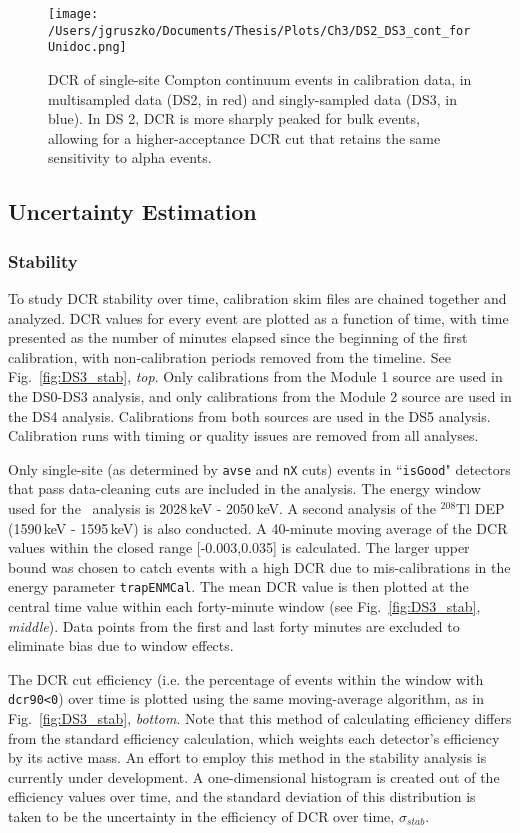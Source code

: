 \begin{figure}[h]
 \centering
 \texttt{[image: /Users/jgruszko/Documents/Thesis/Plots/Ch3/DS2\_DS3\_cont\_forUnidoc.png]}
 \caption[Comparison of DCR in singly-sampled and multi-sampled MJD data sets]{DCR of single-site Compton continuum events in calibration data, in multisampled data (DS2, in red) and singly-sampled data (DS3, in blue). In DS 2, DCR is more sharply peaked for bulk events, allowing for a higher-acceptance DCR cut that retains the same sensitivity to alpha events.} 
 \label{fig:DS2_DS3_comparison}
\end{figure}


\subsection{Uncertainty Estimation}
\subsubsection{Stability}
To study DCR stability over time, calibration skim files are chained together and analyzed.  DCR values for every event are plotted as a function of time, with time presented as the number of minutes elapsed since the beginning of the first calibration, with non-calibration periods removed from the timeline. See Fig.~\ref{fig:DS3_stab}, {\it top}. Only calibrations from the Module 1 source are used in the DS0-DS3 analysis, and only calibrations from the Module 2 source are used in the DS4 analysis.  Calibrations from both sources are used in the DS5 analysis. Calibration runs with timing or quality issues are removed from all analyses.  

Only single-site (as determined by {\tt avse} and {\tt nX} cuts) events in ``{\tt isGood}" detectors that pass data-cleaning cuts are included in the analysis. The energy window used for the \nonubb\ analysis is 2028\,keV - 2050\,keV. A second analysis of the $^{208}$Tl DEP (1590\,keV - 1595\,keV) is also conducted. A 40-minute moving average of the DCR values within the closed range [-0.003,0.035] is calculated. The larger upper bound was chosen to catch events with a high DCR due to mis-calibrations in the energy parameter {\tt trapENMCal}. The mean DCR value is then plotted at the central time value within each forty-minute window (see Fig.~\ref{fig:DS3_stab}, {\it middle}). Data points from the first and last forty minutes are excluded to eliminate bias due to window effects. 

The DCR cut efficiency (i.e.  the percentage of events within the window with {\tt dcr90<0}) over time is plotted using the same moving-average algorithm, as in Fig.~\ref{fig:DS3_stab}, {\it bottom}. Note that this method of calculating efficiency differs from the standard efficiency calculation, which weights each detector's efficiency by its active mass.  An effort to employ this method in the stability analysis is currently under development. A one-dimensional histogram is created out of the efficiency values over time, and the standard deviation of this distribution is taken to be the uncertainty in the efficiency of DCR over time, $\sigma_{stab}$. 

